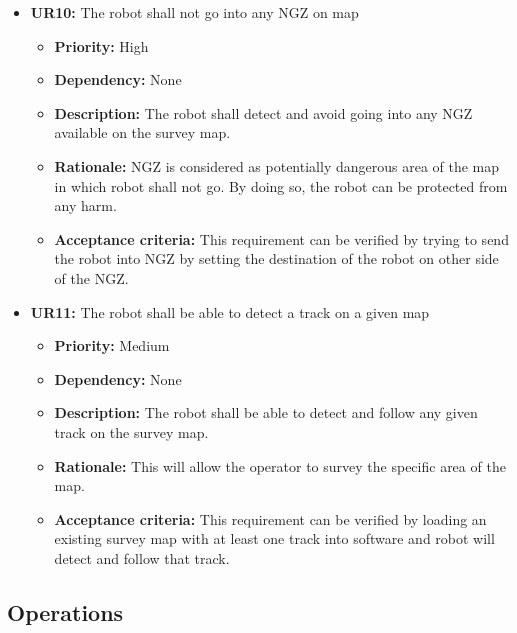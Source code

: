 \documentclass[10pt,a4paper,titlepage]{article}
\begin{document}
	\begin{itemize}
		\item \textbf{UR10:} The robot shall not go into any NGZ on map
		\begin{itemize}
			\item \textbf{Priority:} High
            \item \textbf{Dependency:} None
			\item \textbf{Description:} The robot shall detect and avoid going into any NGZ available on the survey map. 
            \item \textbf{Rationale:} NGZ is considered as potentially dangerous area of the map in which robot shall not go. By doing so, the robot can be protected from any harm.  
            \item \textbf{Acceptance criteria:} This requirement can be verified by trying to send the robot into NGZ by setting the destination of the robot on other side of the NGZ.  
		\end{itemize} 
	\end{itemize}
    \begin{itemize}
		\item \textbf{UR11:} The robot shall be able to detect a track on a given map
		\begin{itemize}
			\item \textbf{Priority:} Medium
            \item \textbf{Dependency:} None
			\item \textbf{Description:} The robot shall be able to detect and follow any given track on the survey map.  
            \item \textbf{Rationale:} This will allow the operator to survey the specific area of the map. 
            \item \textbf{Acceptance criteria:}  This requirement can be verified by loading an existing survey map with at least one track into software and robot will detect and follow that track. 
		\end{itemize} 
	\end{itemize}
	
	\subsection{Operations}
   
\end{document}
